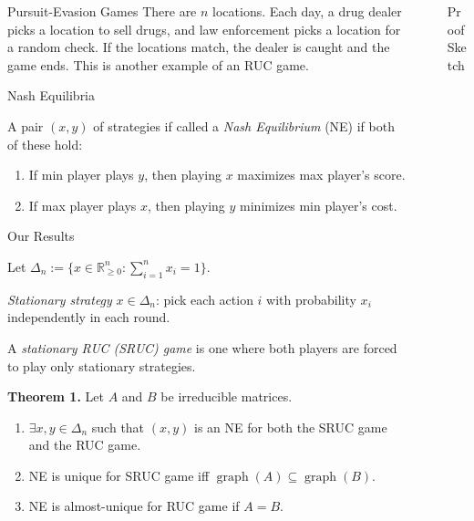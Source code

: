 \documentclass[final,20pt]{beamer}
\newlength{\sepwidth}
\newlength{\colwidth}
\newcommand{\separatorcolumn}{\begin{column}{\sepwidth}\end{column}}
\newcommand*{\defeq}{:=}
\DeclareMathOperator{\graph}{graph}
\begin{document}
\begin{frame}[t]
\begin{columns}[t]
\begin{column}{\colwidth}
\begin{block}{Pursuit-Evasion Games}
There are $n$ locations. Each day, a drug dealer picks a location to sell drugs,
and law enforcement picks a location for a random check.
If the locations match, the dealer is caught and the game ends.
This is another example of an RUC game.

\end{block}

\begin{block}{Nash Equilibria}

A pair $(x, y)$ of strategies if called a \emph{Nash Equilibrium} (NE) if both of these hold:
\begin{enumerate}
\item If min player plays $y$, then playing $x$ maximizes max player's score.
\item If max player plays $x$, then playing $y$ minimizes min player's cost.
\end{enumerate}

\end{block}

\begin{alertblock}{Our Results}

Let $\Delta_n \defeq \{x \in \mathbb{R}_{\ge 0}^n: \sum_{i=1}^n x_i = 1\}$.

\emph{Stationary strategy} $x \in \Delta_n$:
pick each action $i$ with probability $x_i$ independently in each round.

A \emph{stationary RUC (SRUC) game} is one where both players are
forced to play only stationary strategies.

\textbf{Theorem 1.}
Let $A$ and $B$ be irreducible matrices.
\begin{enumerate}
\item $\exists x, y \in \Delta_n$ such that
    $(x, y)$ is an NE for both the SRUC game and the RUC game.
\item NE is unique for SRUC game iff $\graph(A) \subseteq \graph(B)$.
\item NE is almost-unique for RUC game if $A = B$.
\end{enumerate}

\end{alertblock}

\end{column}

\separatorcolumn

\begin{column}{\colwidth}

\begin{block}{Proof Sketch}


\end{block}
\end{column}
\end{columns}
\end{frame}
\end{document}
